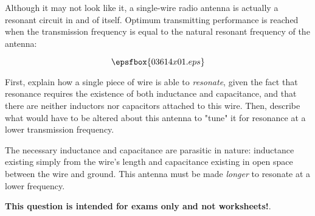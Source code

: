 

Although it may not look like it, a single-wire radio antenna is actually a resonant circuit in and of itself.  Optimum transmitting performance is reached when the transmission frequency is equal to the natural resonant frequency of the antenna:

$$\epsfbox{03614x01.eps}$$

First, explain how a single piece of wire is able to {\it resonate}, given the fact that resonance requires the existence of both inductance and capacitance, and that there are neither inductors nor capacitors attached to this wire.  Then, describe what would have to be altered about this antenna to "tune" it for resonance at a lower transmission frequency.







The necessary inductance and capacitance are parasitic in nature: inductance existing simply from the wire's length and capacitance existing in open space between the wire and ground.  This antenna must be made {\it longer} to resonate at a lower frequency.







{\bf This question is intended for exams only and not worksheets!}.



